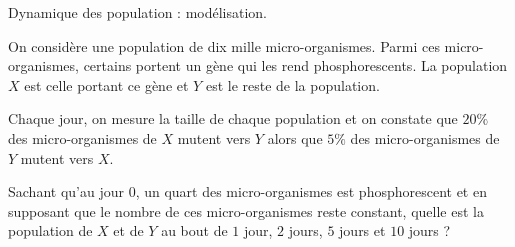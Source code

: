 
\begin{exercice}\label{exoTD3-0006}

	Dynamique des population : modélisation.

	On considère une population de dix mille micro-organismes. Parmi ces micro-organismes, certains portent un gène qui les rend phosphorescents. La population $X$ est celle portant ce gène et $Y$ est le reste de la population.

	Chaque jour, on mesure la taille de chaque population et on constate que $20\%$ des micro-organismes de $X$ mutent vers $Y$ alors que $5\%$ des micro-organismes de $Y$ mutent vers $X$.

	Sachant qu'au jour $0$, un quart des micro-organismes est phosphorescent et en supposant que le nombre de ces micro-organismes reste constant, quelle est la population de $X$ et de $Y$ au bout de $1$ jour, $2$ jours, $5$ jours et $10$ jours ?

\end{exercice}
